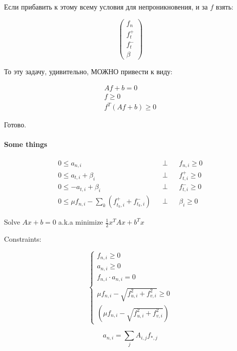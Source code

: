 \documentclass[14pt,russian]{extarticle}
\begin{document}
Если прибавить к этому всему условия для непроникновения, и за $f$ взять:

\[\begin{pmatrix}
f_n \\ f_t^+ \\ f_t^- \\ \beta
\end{pmatrix}\]

То эту задачу, удивительно, МОЖНО привести к виду:

\[
\begin{matrix}
    Af + b = 0 \\
    f \ge 0 \\
    f^T (Af + b) \ge 0
\end{matrix}
\]

Готово.

\paragraph{Some things}
\[
\begin{matrix}
    0 \le a_{n,i} && \perp && f_{n,i} \ge 0 \\
    0 \le a_{t,i} + \beta_i && \perp && f_{t,i}^+ \ge 0 \\
    0 \le -a_{t,i} + \beta_i && \perp && f_{t,i}^- \ge 0 \\
    0 \le \mu f_{n,i} - \sum_k (f_{t_k,i}^+ + f_{t_k,i}^-) && \perp && \beta_i \ge 0
\end{matrix}
\]

Solve $Ax + b = 0$ a.k.a minimize $\frac{1}{2}x^T A x + b^T x$

Constraints:

\[
\begin{cases}
f_{n,i} \ge 0 \\
a_{n,i} \ge 0 \\
f_{n,i} \cdot a_{n,i} = 0 \\
\\
\mu f_{n,i} - \sqrt{f_{u,i}^2 + f_{v,i}^2} \ge 0 \\
(\mu f_{n,i} - \sqrt{f_{u,i}^2 + f_{v,i}^2})
\end{cases}
\]

\[
a_{n,i} = \sum_j{A_{i,j} f_{*,j}}
\]
\end{document}
